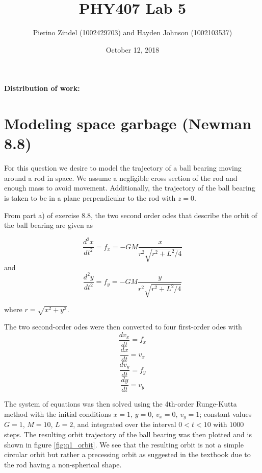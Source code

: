 \documentclass{article}
\title{PHY407 Lab 5}
\author{Pierino Zindel (1002429703) and Hayden Johnson (1002103537)}
\date{October 12, 2018}
\begin{document}
\maketitle

\noindent \textbf{Distribution of work:}

\section{Modeling space garbage (Newman 8.8)}

For this question we desire to model the trajectory of a ball bearing moving around a rod in space. We assume a negligible cross section of the rod and enough mass to avoid movement. Additionally, the trajectory of the ball bearing is taken to be in a plane perpendicular to the rod with $z=0$.

From part a) of exercise 8.8, the two second order odes that describe the orbit of the ball bearing are given as 

\begin{equation}
	\frac{d^2x}{dt^2} = f_x = -GM\frac{x}{r^2\sqrt{r^2 + L^2/4}}
	\label{eq:1}
\end{equation}
and 
\begin{equation}
	\frac{d^2y}{dt^2} = f_y = -GM\frac{y}{r^2\sqrt{r^2 + L^2/4}}
	\label{eq:2}
\end{equation}

where $r=\sqrt{x^2+y^2}$.

The two second-order odes were then converted to four first-order odes with 
\begin{equation}
	\frac{dv_x}{dt} = f_x 
\end{equation}
\begin{equation}
	\frac{dx}{dt} = v_x
\end{equation}
\begin{equation}
	\frac{dv_y}{dt} = f_y 
\end{equation}
\begin{equation}
	\frac{dy}{dt} = v_y 
\end{equation}

The system of equations was then solved using the 4th-order Runge-Kutta method with the initial conditions $x=1$, $y=0$, $v_x=0$, $v_y=1$; constant values $G=1$, $M=10$, $L=2$, and integrated over the interval $0<t<10$ with $1000$ steps. The resulting orbit trajectory of the ball bearing was then plotted and is shown in figure \ref{fig:q1_orbit}. We see that the resulting orbit is not a simple circular orbit but rather a precessing orbit as suggested in the textbook due to the rod having a non-spherical shape.
\end{document}
